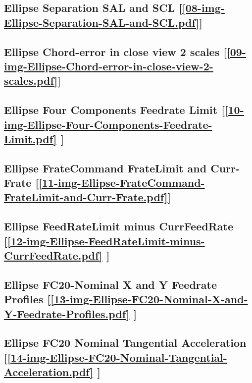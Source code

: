 \subsection       {Ellipse Separation SAL and SCL
[\ref      {08-img-Ellipse-Separation-SAL-and-SCL.pdf}] }
\label{ssec-08-img-Ellipse-Separation-SAL-and-SCL.pdf}

\subsection       {Ellipse Chord-error in close view 2 scales
[\ref      {09-img-Ellipse-Chord-error-in-close-view-2-scales.pdf}] }
\label{ssec-09-img-Ellipse-Chord-error-in-close-view-2-scales.pdf}

\subsection       {Ellipse Four Components Feedrate Limit
[\ref      {10-img-Ellipse-Four-Components-Feedrate-Limit.pdf} ] }
\label{ssec-10-img-Ellipse-Four-Components-Feedrate-Limit.pdf}

\subsection    {Ellipse FrateCommand FrateLimit and Curr-Frate
[\ref      {11-img-Ellipse-FrateCommand-FrateLimit-and-Curr-Frate.pdf}] }
\label{ssec-11-img-Ellipse-FrateCommand-FrateLimit-and-Curr-Frate.pdf}

\subsection     {Ellipse FeedRateLimit minus CurrFeedRate
[\ref      {12-img-Ellipse-FeedRateLimit-minus-CurrFeedRate.pdf} ] }
\label{ssec-12-img-Ellipse-FeedRateLimit-minus-CurrFeedRate.pdf}

\subsection     {Ellipse FC20-Nominal X and Y Feedrate Profiles
[\ref      {13-img-Ellipse-FC20-Nominal-X-and-Y-Feedrate-Profiles.pdf} ] }
\label{ssec-13-img-Ellipse-FC20-Nominal-X-and-Y-Feedrate-Profiles.pdf}

\subsection     {Ellipse FC20 Nominal Tangential Acceleration
[\ref      {14-img-Ellipse-FC20-Nominal-Tangential-Acceleration.pdf} ] }
\label{ssec-14-img-Ellipse-FC20-Nominal-Tangential-Acceleration.pdf}

